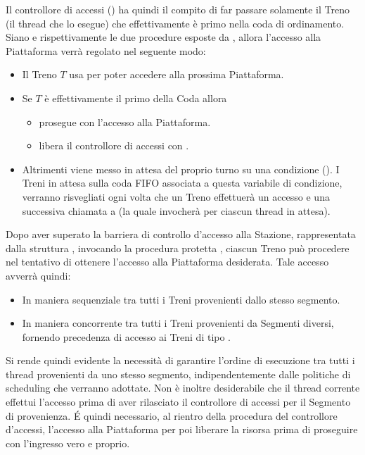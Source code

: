 \begin{description}
		Il controllore di accessi () ha quindi il compito di far passare solamente il Treno (il thread che lo esegue) che effettivamente è primo nella coda di ordinamento.
		Siano  e  rispettivamente le due procedure esposte da , allora l'accesso alla Piattaforma verrà regolato nel seguente modo:
			\begin{itemize}
				\item Il Treno $T$ usa  per poter accedere alla prossima Piattaforma.
				\item Se $T$ è effettivamente il primo della Coda allora 
					\begin{itemize}
						\item prosegue con l'accesso alla Piattaforma. 
						\item libera il controllore di accessi  con . 
					\end {itemize}
				\item Altrimenti viene messo in attesa del proprio turno su una condizione (). I Treni in attesa sulla coda FIFO associata a questa variabile di condizione, verranno risvegliati ogni volta che un Treno effettuerà un accesso e una successiva chiamata a  (la quale invocherà  per ciascun thread in attesa).
			\end{itemize}
		
		
		\item{}
		
		Dopo aver superato la barriera di controllo d'accesso alla Stazione, rappresentata dalla struttura , invocando la procedura protetta , ciascun Treno può procedere nel tentativo di ottenere l'accesso alla Piattaforma desiderata. Tale accesso avverrà quindi:
		
		\begin{itemize}
			\item In maniera sequenziale tra tutti i Treni provenienti dallo stesso segmento.
			\item In maniera concorrente tra tutti i Treni provenienti da Segmenti diversi, fornendo precedenza di accesso ai Treni di tipo .
		\end{itemize}
		
		Si rende quindi evidente la necessità di garantire l'ordine di esecuzione tra tutti i thread provenienti da uno stesso segmento, indipendentemente dalle politiche di scheduling che verranno adottate. Non è inoltre desiderabile che il thread corrente effettui l'accesso prima di aver rilasciato il controllore di accessi per il Segmento di provenienza. \'E quindi necessario, al rientro della procedura  del controllore d'accessi,  l'accesso alla Piattaforma per poi liberare la risorsa  prima di proseguire con l'ingresso vero e proprio.
				  

\end{description}
